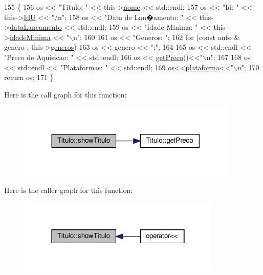 \begin{DoxyCode}
155  \{
156     os << \textcolor{stringliteral}{"Titulo: "} << this->\hyperlink{classTitulo_a8abdf1fc6d4fc14be20bbec247664d83}{nome} << std::endl;
157     os << \textcolor{stringliteral}{"Id: "} << this->\hyperlink{classTitulo_aff7d1cc9accbc0f49c05cdc97c66844c}{IdU} << \textcolor{stringliteral}{"/n"};
158     os << \textcolor{stringliteral}{"Data de Lan�amento: "} << this->\hyperlink{classTitulo_ae540ddf2c607eb0e4de29eb8c0cca7f0}{dataLancamento} << std::endl;
159     os << \textcolor{stringliteral}{"Idade Minima: "} << this->\hyperlink{classTitulo_a28891078f53fc3317de60ae739514955}{idadeMinima} << \textcolor{stringliteral}{"\(\backslash\)n"};
160 
161     os << \textcolor{stringliteral}{"Generos: "};
162     \textcolor{keywordflow}{for} (\textcolor{keyword}{const} \textcolor{keyword}{auto} & genero : this->\hyperlink{classTitulo_a3209265c8534416978ee9891b96c14b2}{generos})
163         os << genero << \textcolor{stringliteral}{";"};
164 
165     os << std::endl << \textcolor{stringliteral}{"Preco de Aquisicao: "} << std::endl;
166     os << \hyperlink{classTitulo_a93725bdc2e98350e47b54fd76c0fa236}{getPreco}()<<\textcolor{stringliteral}{"\(\backslash\)n"};
167 
168     os << std::endl << \textcolor{stringliteral}{"Plataformas: "} << std::endl;
169     os<<\hyperlink{classTitulo_a67761eb7f006453ab0869e4b7c0a9c0b}{plataforma}<<\textcolor{stringliteral}{"\(\backslash\)n"};
170     \textcolor{keywordflow}{return} os;
171  \}
\end{DoxyCode}
Here is the call graph for this function\+:
\nopagebreak
\begin{figure}[H]
\begin{center}
\leavevmode
\includegraphics[width=296pt]{classTitulo_ab31e1d801062a75abdb10664de23d897_cgraph}
\end{center}
\end{figure}
Here is the caller graph for this function\+:
\nopagebreak
\begin{figure}[H]
\begin{center}
\leavevmode
\includegraphics[width=274pt]{classTitulo_ab31e1d801062a75abdb10664de23d897_icgraph}
\end{center}
\end{figure}


